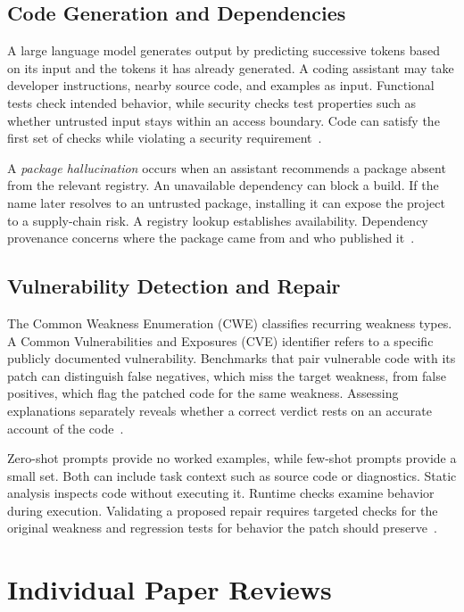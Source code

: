 \documentclass[conference]{IEEEtran}
\begin{document}
\subsection{Code Generation and Dependencies}
A large language model generates output by predicting successive tokens based on its input and the tokens it has already generated. A coding assistant may take developer instructions, nearby source code, and examples as input. Functional tests check intended behavior, while security checks test properties such as whether untrusted input stays within an access boundary. Code can satisfy the first set of checks while violating a security requirement~\cite{pearce2025copilot,perry2023insecure}.

A \emph{package hallucination} occurs when an assistant recommends a package absent from the relevant registry. An unavailable dependency can block a build. If the name later resolves to an untrusted package, installing it can expose the project to a supply-chain risk. A registry lookup establishes availability. Dependency provenance concerns where the package came from and who published it~\cite{spracklen2025packages}.

\subsection{Vulnerability Detection and Repair}
The Common Weakness Enumeration (CWE) classifies recurring weakness types. A Common Vulnerabilities and Exposures (CVE) identifier refers to a specific publicly documented vulnerability. Benchmarks that pair vulnerable code with its patch can distinguish false negatives, which miss the target weakness, from false positives, which flag the patched code for the same weakness. Assessing explanations separately reveals whether a correct verdict rests on an accurate account of the code~\cite{ullah2024secllmholmes}.

Zero-shot prompts provide no worked examples, while few-shot prompts provide a small set. Both can include task context such as source code or diagnostics. Static analysis inspects code without executing it. Runtime checks examine behavior during execution. Validating a proposed repair requires targeted checks for the original weakness and regression tests for behavior the patch should preserve~\cite{ullah2024secllmholmes,pearce2023repair}.

\section{Individual Paper Reviews}\label{sec:reviews}
\end{document}
